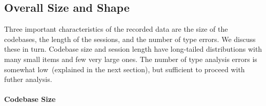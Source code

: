 \documentclass[english,submission,cleveref]{programming}
\begin{document}


\subsection{Overall Size and Shape}

Three important characteristics of the recorded data are the size of the codebases,
the length of the sessions, and the number of type
errors.
We discuss these in turn.
Codebase size and session length have long-tailed distributions
with many small items and few very large ones.
The number of type analysis errors is somewhat low~(explained in the next
section), but sufficient to proceed with futher analysis.


\paragraph{Codebase Size}
\end{document}
